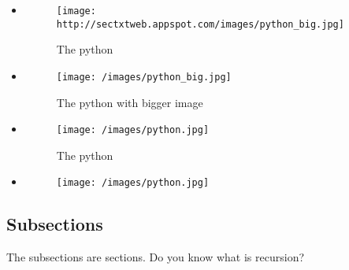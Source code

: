 \documentclass[a4paper,11pt]{article}
\begin{document}
\begin{itemize}
\item  \begin{figure}[ht!]
		\centering
		\texttt{[image: http://sectxtweb.appspot.com/images/python\_big.jpg]}
		\caption{The python}
		\label{overflow}
		\end{figure}
		 
\item  \begin{figure}[ht!]
		\centering
		\texttt{[image: /images/python\_big.jpg]}
		\caption{The python with bigger image}
		\label{overflow}
		\end{figure}
		 
\item  \begin{figure}[ht!]
		\centering
		\texttt{[image: /images/python.jpg]}
		\caption{The python}
		\label{overflow}
		\end{figure}
		 
\item  \begin{figure}[ht!]
		\centering
		\texttt{[image: /images/python.jpg]}
		\label{overflow}
		\end{figure}
		
\end{itemize}
\subsection{Subsections}
The subsections are sections. Do you know what is recursion?
\end{document}
